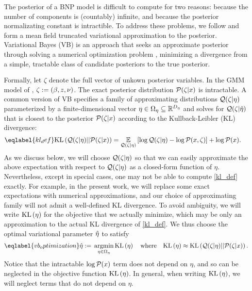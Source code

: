 The posterior of a BNP model is difficult to compute for two reasons: because
the number of components is (countably) infinite, and because the posterior
normalizating constant is intractible.  To address these problems, we follow
\citet{blei:2006:vi_for_dp} and form a mean field truncated variational
approximation to the posterior. Variational Bayes (VB) is an approach that seeks
an approximate posterior through solving a numerical optimization problem
\citep{jordan:1999:vi, wainwright:2008:graphical_models, blei:2017:vi_review},
minimizing a divergence from a simple, tractable class of candidate posteriors
to the true posterior.

Formally, let $\zeta$ denote the full vector of unkown posterior variables. In
the GMM model of , $\zeta := (\beta, z, \nu)$.  The
exact posterior distribution $\mathcal{P}(\zeta \vert x)$ is intractable. A common
version of VB specifies a family of approximating distributions $\mathcal{Q}(\zeta \vert
\eta)$ parameterized by a finite-dimensional vector $\eta \in \Omega_{\eta} \subseteq
\mathbb{R}^{{D_{\eta}}}$ and solves for $\mathcal{Q}(\zeta\vert\hat\eta)$ that is closest to
the posterior $\mathcal{P}(\zeta \vert x)$ according to  the Kullback-Leibler (KL)
divergence:
%
\begin{align}\eqlabel{kl_def}
%
\KL{\q(\zeta \vert \eta) || \p(\zeta \vert \x)}
={}&    \expect{\q(\zeta \vert \eta)}{
        \log \q(\zeta \vert \eta) - \logp(\x, \zeta)} + \logp(\x).
%
\end{align}
%
As we discuss below, we will choose $\mathcal{Q}(\zeta \vert \eta)$ so that we can easily
approximate the above expectation with respect to $\mathcal{Q}(\zeta \vert \eta)$ as a
closed-form function of $\eta$.  Nevertheless, except in special cases, one may
not be able to compute \eqref{kl_def} exactly.  For example, in the present
work, we will replace some exact expectations with numerical approximations, and
our choice of approximating family will not admit a well-defined KL divergence.
To avoid ambiguity, we will write $\mathrm{KL}\left(\eta\right)$ for the objective that we actually
minimize, which may be only an approximation to the actual KL divergence of
\eqref{kl_def}.  We thus choose the optimal variational parameter $\hat\eta$ to
satisfy
%
\begin{align}\eqlabel{vb_optimization}
%
\etaopt :={} \argmin_{\eta \in \etadom} \KL{\eta} \mathwhere
\KL{\eta} \approx{} \KL{\q(\zeta \vert \eta) || \p(\zeta \vert \x)}.
%
\end{align}
%
Notice that the intractable $\log \mathcal{P}(x)$ term does not depend on $\eta$, and so
can be neglected in the objective function $\mathrm{KL}\left(\eta\right)$.  In general, when
writing $\mathrm{KL}\left(\eta\right)$, we will neglect terms that do not depend on $\eta$.

